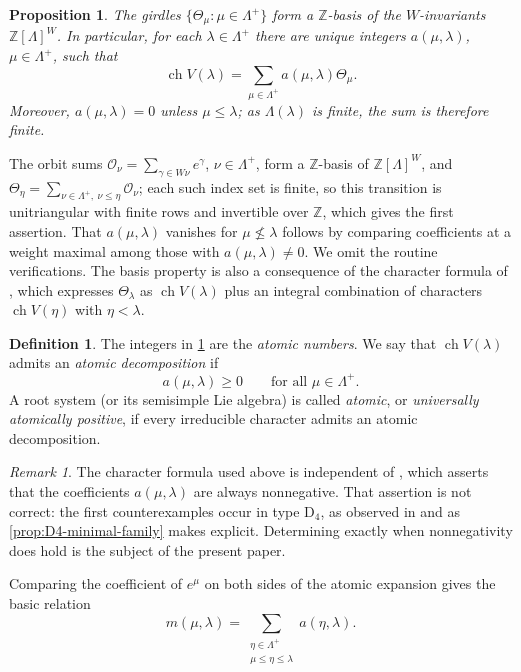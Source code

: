 \documentclass[11pt]{article}
\newtheorem{proposition}[proposition]{Proposition}
\theoremstyle{definition}
\newtheorem{definition}[definition]{Definition}
\theoremstyle{remark}
\newtheorem{remark}[remark]{Remark}
\newcommand{\Pesos}{\Lambda}
\newcommand{\Weyl}{W}
\newcommand{\chr}{\operatorname{ch}}
\newcommand{\typeD}{\ensuremath{\mathrm{D}}}
\newcommand{\Z}{\mathbb Z}
\begin{document}
\begin{proposition}\label{prop:integral-expansion}
The girdles $\{\Theta_\mu:\mu\in\Pesos^+\}$ form a $\Z$-basis of the
$\Weyl$-invariants $\Z[\Pesos]^\Weyl$.  In particular, for each
$\lambda\in\Pesos^+$ there are unique integers $a(\mu,\lambda)$,
$\mu\in\Pesos^+$, such that
\[
    \chr V(\lambda)
      =\sum_{\mu\in\Pesos^+}a(\mu,\lambda)\Theta_\mu.
\]
Moreover, $a(\mu,\lambda)=0$ unless $\mu\le\lambda$; as $\Pesos(\lambda)$ is
finite, the sum is therefore finite.
\end{proposition}

The orbit sums $\mathcal O_\nu=\sum_{\gamma\in\Weyl\nu}e^\gamma$,
$\nu\in\Pesos^+$, form a $\Z$-basis of $\Z[\Pesos]^\Weyl$, and
$\Theta_\eta=\sum_{\nu\in\Pesos^+,\ \nu\le\eta}\mathcal O_\nu$; each such index set is
finite, so this transition is unitriangular with finite rows and invertible
over $\Z$, which gives the first assertion.  That $a(\mu,\lambda)$ vanishes
for $\mu\nleq\lambda$ follows by comparing coefficients at a weight maximal
among those with $a(\mu,\lambda)\ne0$.  We omit the routine verifications.
The basis property is also a consequence of the character formula of
\cite[Theorem~2.1]{Schutzer}, which expresses $\Theta_\lambda$ as
$\chr V(\lambda)$ plus an integral combination of characters $\chr V(\eta)$
with $\eta<\lambda$.

\begin{definition}
The integers in \cref{prop:integral-expansion} are the \emph{atomic numbers}.
We say that $\chr V(\lambda)$ admits an \emph{atomic decomposition} if
\[
     a(\mu,\lambda)\ge0
     \qquad\text{for all }\mu\in\Pesos^+.
\]
A root system (or its semisimple Lie algebra) is called \emph{atomic}, or
\emph{universally atomically positive}, if every irreducible character admits
an atomic decomposition.
\end{definition}

\begin{remark}\label{rem:schutzer-thm22}
The character formula \cite[Theorem~2.1]{Schutzer} used above is independent
of \cite[Theorem~2.2]{Schutzer}, which asserts that the coefficients
$a(\mu,\lambda)$ are always nonnegative.  That assertion is not correct: the
first counterexamples occur in type $\typeD_4$, as observed in
\cite[Example~2.6]{MR4178925} and as \cref{prop:D4-minimal-family} makes
explicit.  Determining exactly when nonnegativity does hold is the subject of
the present paper.
\end{remark}

Comparing the coefficient of $e^\mu$ on both sides of the atomic expansion
gives the basic relation
\begin{equation}\label{eq:m-from-a}
    m(\mu,\lambda)
       =\sum_{\substack{\eta\in\Pesos^+\\ \mu\le\eta\le\lambda}}
          a(\eta,\lambda).
\end{equation}
\end{document}
